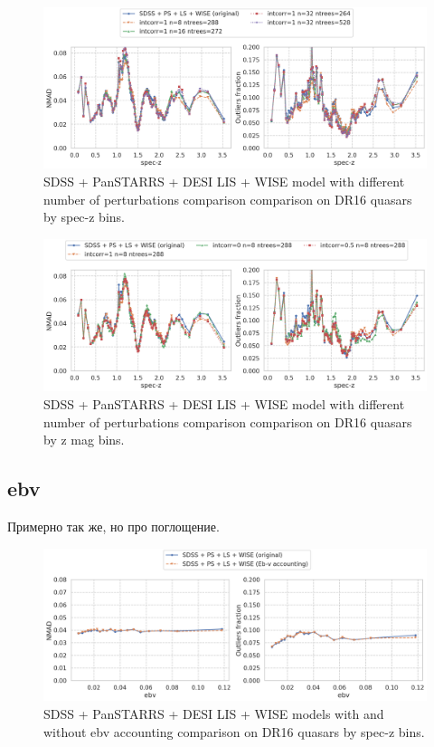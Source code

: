 \begin{figure}
    \centering
    \includegraphics[width=\linewidth]{images/perturbations-n-35-zspec.png}
    \caption{SDSS + PanSTARRS + DESI LIS + WISE model with different number of perturbations comparison comparison on DR16 quasars by spec-z bins.}
    \label{fig:perturbations_n_35_zspec}
\end{figure}

\begin{figure}
    \centering
    \includegraphics[width=\linewidth]{images/perturbations-intcorr-35-zspec.png}
    \caption{SDSS + PanSTARRS + DESI LIS + WISE model with different number of perturbations comparison comparison on DR16 quasars by z mag bins.}
    \label{fig:perturbations_n_35_z}
\end{figure}

\subsection{ebv}

Примерно так же, но про поглощение.

\begin{figure}
    \centering
    \includegraphics[width=\linewidth]{images/ebv-35-ebv.png}
    \caption{SDSS + PanSTARRS + DESI LIS + WISE models with and without ebv accounting comparison on DR16 quasars by spec-z bins.}
    \label{fig:ebv_35_zspec}
\end{figure}

